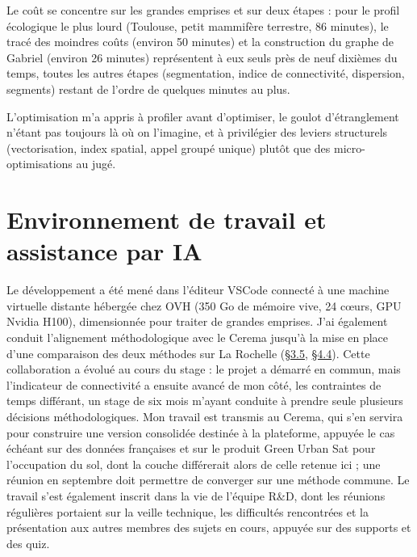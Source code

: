 \documentclass[a4paper,11pt]{report}
\begin{document}
Le coût se concentre sur les grandes emprises et sur deux étapes : pour le profil écologique le plus lourd (Toulouse, petit mammifère terrestre, 86 minutes), le tracé des moindres coûts (environ 50 minutes) et la construction du graphe de Gabriel (environ 26 minutes) représentent à eux seuls près de neuf dixièmes du temps, toutes les autres étapes (segmentation, indice de connectivité, dispersion, segments) restant de l'ordre de quelques minutes au plus.

L'optimisation m'a appris à profiler avant d'optimiser, le goulot d'étranglement n'étant pas toujours là où on l'imagine, et à privilégier des leviers structurels (vectorisation, index spatial, appel groupé unique) plutôt que des micro-optimisations au jugé.

\section{Environnement de travail et assistance par IA}\label{sec:6.5}

Le développement a été mené dans l'éditeur VSCode connecté à une machine virtuelle distante hébergée chez OVH (350 Go de mémoire vive, 24 c\oe{}urs, GPU Nvidia H100), dimensionnée pour traiter de grandes emprises. J'ai également conduit l'alignement méthodologique avec le Cerema jusqu'à la mise en place d'une comparaison des deux méthodes sur La Rochelle (\hyperref[sec:3.5]{§3.5}, \hyperref[sec:4.4]{§4.4}). Cette collaboration a évolué au cours du stage : le projet a démarré en commun, mais l'indicateur de connectivité a ensuite avancé de mon côté, les contraintes de temps différant, un stage de six mois m'ayant conduite à prendre seule plusieurs décisions méthodologiques. Mon travail est transmis au Cerema, qui s'en servira pour construire une version consolidée destinée à la plateforme, appuyée le cas échéant sur des données françaises et sur le produit Green Urban Sat pour l'occupation du sol, dont la couche différerait alors de celle retenue ici ; une réunion en septembre doit permettre de converger sur une méthode commune. Le travail s'est également inscrit dans la vie de l'équipe R\&D, dont les réunions régulières portaient sur la veille technique, les difficultés rencontrées et la présentation aux autres membres des sujets en cours, appuyée sur des supports et des quiz.
\end{document}

